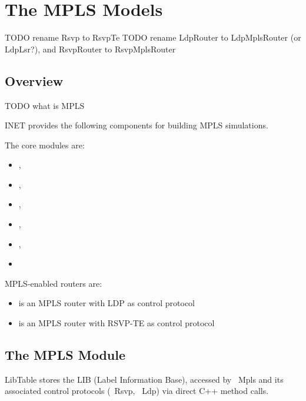 \chapter{The MPLS Models}
\label{cha:mpls}


TODO rename Rsvp to RsvpTe
TODO rename LdpRouter to LdpMplsRouter (or LdpLsr?), and RsvpRouter to RsvpMplsRouter

\section{Overview}

TODO what is MPLS

INET provides the following components for building MPLS simulations.

The core modules are:

\begin{itemize}
  \item {}, 
  \item {}, 
  \item {}, 
  \item {}, 
  \item {}, 
  \item {} 
\end{itemize}

MPLS-enabled routers are:

\begin{itemize}
  \item {} is an MPLS router with LDP as control protocol
  \item {} is an MPLS router with RSVP-TE as control protocol 
\end{itemize}


\section{The MPLS Module}


LibTable stores the LIB (Label Information Base), accessed by ~Mpls and its
associated control protocols (~Rsvp, ~Ldp) via direct C++ method calls.

